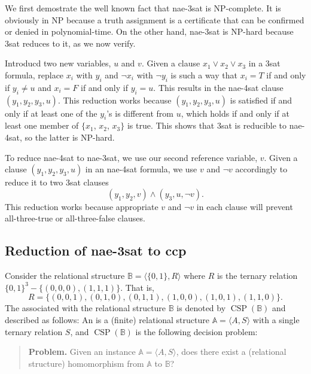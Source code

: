 \documentclass[12pt]{amsart}
\numberwithin{equation}{section}
\theoremstyle{plain}
\theoremstyle{definition}
\newcommand{\ccp}{\acs{ccp}\xspace}
\newcommand{\sat}{\acs{sat}\xspace}
\newcommand{\nae}{\acs{nae}\xspace}
\newcommand{\NP}{\acs{NP}\xspace}
\begin{document}
We first demostrate the well known fact that \nae-3\sat is \NP-complete.
It is obviously in \NP because a truth assignment is a certificate
that can be confirmed or denied in polynomial-time.
On the other hand, \nae-3\sat is \NP-hard because 3\sat reduces to it, as we now
verify.

Introducd two new variables, $u$ and $v$.
Given a clause $x_1 \vee x_2 \vee x_3$ in a 3\sat formula,
replace $x_i$ with $y_i$ and $\neg x_i$ with
$\neg y_i$ is such a way that $x_i = T$ if and only if
$y_i \neq u$ and $x_i = F$ if and only if $y_i = u$.
This results in the \nae-4\sat clause 
$(y_1, y_2, y_3, u)$.  This reduction works because
$(y_1, y_2, y_3, u)$ is satisfied if and only if at least one of the $y_i$'s is
different from $u$, which holds if and only if
at least one member of $\{x_1$, $x_2$, $x_3\}$ is true.
This shows that 3\sat is reducible to \nae-4\sat, so the latter is \NP-hard.

To reduce \nae-4\sat to \nae-3\sat, we use our second reference variable, $v$.
Given a clause $(y_1, y_2, y_3, u)$ in an \nae-4\sat formula,
we use $v$ and $\neg v$ accordingly to reduce it to two 3\sat clauses
\[(y_1, y_2, v) \wedge (y_3, u, \neg v). \] This reduction works
because appropriate $v$ and $\neg v$ in each clause will prevent
all-three-true or all-three-false clauses.

\subsection{Reduction of \nae-3\sat to \ccp}
Consider the relational structure $\mathbb B = \langle \{0, 1\}, R\rangle$
where $R$ is the ternary relation $\{0, 1\}^3 - \{(0,0,0), (1,1,1)\}$.
That is,
\[ R = \{(0,0,1), (0,1,0), (0,1,1), (1,0,0), (1,0,1), (1,1,0)\}.\]
The \csp associated with the relational structure $\mathbb B$
is denoted by $\operatorname{CSP}(\mathbb B)$ and described as follows:
An  %
is a (finite) relational structure $\mathbb A = \langle A, S \rangle$
with a single ternary relation $S$, and $\operatorname{CSP}(\mathbb B)$ is the
following decision problem:

\begin{quote}
{\bf Problem.} Given an instance $\mathbb A = \langle A, S \rangle$,
does there exist a (relational structure) homomorphism from $\mathbb A$ to $\mathbb B$?
\end{quote}
\end{document}
